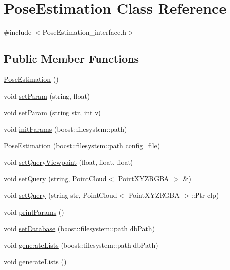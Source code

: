 \hypertarget{classPoseEstimation}{\section{Pose\-Estimation Class Reference}
\label{classPoseEstimation}
}


{\ttfamily \#include $<$Pose\-Estimation\-\_\-interface.\-h$>$}

\subsection*{Public Member Functions}
\begin{DoxyCompactItemize}
\item 
\hyperlink{classPoseEstimation_a47946518bc5a77dea91403373a1245d5}{Pose\-Estimation} ()
\item 
void \hyperlink{classPoseEstimation_af3d24a99d20186d2ceff9a9d9f6b12b0}{set\-Param} (string, float)
\item 
void \hyperlink{classPoseEstimation_a4705e759bd5b20e6fe19327b399ac4cd}{set\-Param} (string str, int v)
\item 
void \hyperlink{classPoseEstimation_a262103cc5955b76dae954efa8a11f3a6}{init\-Params} (boost\-::filesystem\-::path)
\item 
\hyperlink{classPoseEstimation_a4fcf971c444b8feb1de5ee99c66533df}{Pose\-Estimation} (boost\-::filesystem\-::path config\-\_\-file)
\item 
void \hyperlink{classPoseEstimation_adeaba8254e4ea0d368fdd61512ffb94e}{set\-Query\-Viewpoint} (float, float, float)
\item 
void \hyperlink{classPoseEstimation_aba47925067451610e5c5f572208785bc}{set\-Query} (string, Point\-Cloud$<$ Point\-X\-Y\-Z\-R\-G\-B\-A $>$ \&)
\item 
void \hyperlink{classPoseEstimation_a926bc2c40483408aac0e6a88b41bd396}{set\-Query} (string str, Point\-Cloud$<$ Point\-X\-Y\-Z\-R\-G\-B\-A $>$\-::Ptr clp)
\item 
void \hyperlink{classPoseEstimation_a7f162e3e5383f895d7b6d1cd228ca076}{print\-Params} ()
\item 
void \hyperlink{classPoseEstimation_a0ace84f98f2bab31e64ffaa4eefdf402}{set\-Database} (boost\-::filesystem\-::path db\-Path)
\item 
void \hyperlink{classPoseEstimation_a7f16094de53753e91efa3d4728a928be}{generate\-Lists} (boost\-::filesystem\-::path db\-Path)
\item 
void \hyperlink{classPoseEstimation_aa240b7ff2e362aa091f531ebd34359ad}{generate\-Lists} ()
\end{DoxyCompactItemize}


